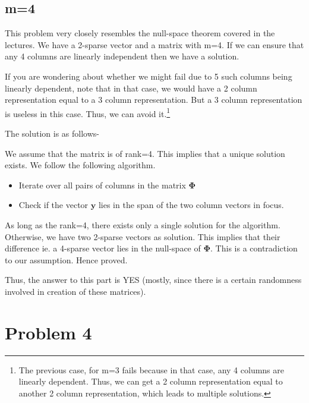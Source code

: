 \documentclass[a4paper,11pt]{article}
\numberwithin{definition}{section}
\numberwithin{mytheorem}{subsection}
\begin{document}
\subsection{m=4}

This problem very closely resembles the null-space theorem covered in the lectures. We have a 2-sparse vector and a matrix with m=4. If we can ensure that any 4 columns are linearly independent then we have a solution. 

If you are wondering about whether we might fail due to 5 such columns being linearly dependent, note that in that case, we would have a 2 column representation equal to a 3 column representation. But a 3 column representation is useless in this case. Thus, we can avoid it.\footnote{The previous case, for m=3 fails because in that case, any 4 columns are linearly dependent. Thus, we can get a 2 column representation equal to another 2 column representation, which leads to multiple solutions.}

The solution is as follows-

We assume that the matrix is of rank=4. This implies that a unique solution exists. We follow the following algorithm.

\begin{itemize}
    \item Iterate over all pairs of columns in the matrix $\mathbf{\Phi}$
    \item Check if the vector $\mathbf{y}$ lies in the span of the two column vectors in focus.
\end{itemize}

As long as the rank=4, there exists only a single solution for the algorithm.
Otherwise, we have two 2-sparse vectors as solution. This implies that their difference ie. a 4-sparse vector lies in the null-space of $\mathbf{\Phi}$. This is a contradiction to our assumption. Hence proved.

Thus, the answer to this part is YES (mostly, since there is a certain randomness involved in creation of these matrices).


\newpage


\section{Problem 4}
\end{document}
